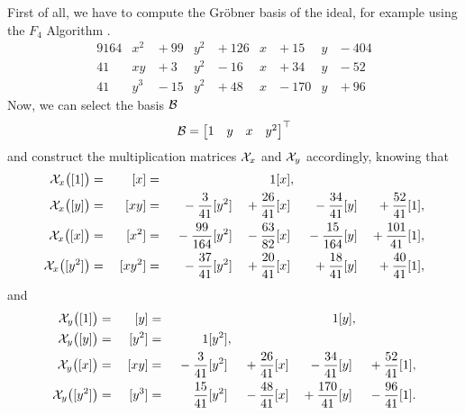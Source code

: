 \begin{example}
  First of all, we have to compute the Gr\"obner basis \cite{Becker93} of the ideal, for example using the $F_4$ Algorithm \cite{F4}.
  \begin{alignat}{9}
    164 & x^2 & {}+{}99 & y^2 & {}+{}126 & x & {}+{}15  & y & {}-{}404\\
    41  & xy  & {}+{}3  & y^2 & {}-{}16  & x & {}+{}34  & y & {}-{}52 \\
    41  & y^3 & {}-{}15 & y^2 & {}+{}48  & x & {}-{}170 & y & {}+{}96
  \end{alignat}
  Now, we can select the basis $\mathcal{B}$
  \begin{align}
    \mathcal{B} = \begin{bmatrix} 1 & y & x & y^2 \end{bmatrix}^\top
  \end{align}
  and construct the multiplication matrices $\mathcal{X}_x$ and $\mathcal{X}_y$ accordingly, knowing that
  \begin{alignat}{12}
    \MM_x\big([1]\big)   & {}={} & [x]    & {}={} &                     &       & 1                  & [x], &                     &     &                     &     \\
    \MM_x\big([y]\big)   & {}={} & [xy]   & {}={} & {}-{}\frac{3}{41}   & [y^2] & {}+{}\frac{26}{41} & [x]  & {}-{}\frac{34}{41}  & [y] & {}+{}\frac{52}{41}  & [1],\\
    \MM_x\big([x]\big)   & {}={} & [x^2]  & {}={} & {}-{}\frac{99}{164} & [y^2] & {}-{}\frac{63}{82} & [x]  & {}-{}\frac{15}{164} & [y] & {}+{}\frac{101}{41} & [1],\\
    \MM_x\big([y^2]\big) & {}={} & [xy^2] & {}={} & {}-{}\frac{37}{41}  & [y^2] & {}+{}\frac{20}{41} & [x]  & {}+{}\frac{18}{41}  & [y] & {}+{}\frac{40}{41}  & [1],
  \end{alignat}
  and
  \begin{alignat}{12}
    \MM_y\big([1]\big)   & {}={} & [y]   & {}={} &                   &        &                    &     &                   1 & [y], &                    &    \\
    \MM_y\big([y]\big)   & {}={} & [y^2] & {}={} &                 1 & [y^2], &                    &     &                     &      &                    &    \\
    \MM_y\big([x]\big)   & {}={} & [xy]  & {}={} & {}-{}\frac{3}{41} & [y^2]  & {}+{}\frac{26}{41} & [x] & {}-{}\frac{34}{41}  & [y]  & {}+{}\frac{52}{41} & [1],\\
    \MM_y\big([y^2]\big) & {}={} & [y^3] & {}={} & \frac{15}{41}     & [y^2]  & {}-{}\frac{48}{41} & [x] & {}+{}\frac{170}{41} & [y]  & {}-{}\frac{96}{41} & [1].
  \end{alignat}

\end{example}
